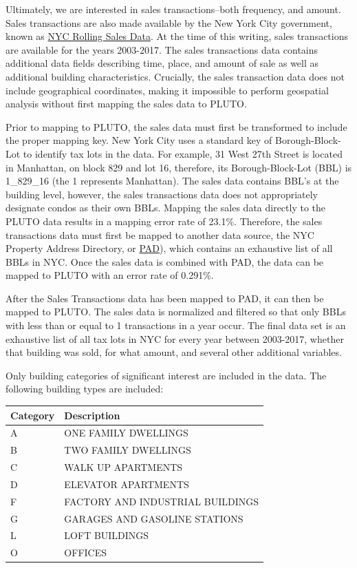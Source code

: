 \documentclass[]{article}
\begin{document}
Ultimately, we are interested in sales transactions--both frequency, and
amount. Sales transactions are also made available by the New York City
government, known as
\href{http://www1.nyc.gov/site/finance/taxes/property-annualized-sales-update.page}{NYC
Rolling Sales Data}. At the time of this writing, sales transactions are
available for the years 2003-2017. The sales transactions data contains
additional data fields describing time, place, and amount of sale as
well as additional building characteristics. Crucially, the sales
transaction data does not include geographical coordinates, making it
impossible to perform geospatial analysis without first mapping the
sales data to PLUTO.

Prior to mapping to PLUTO, the sales data must first be transformed to
include the proper mapping key. New York City uses a standard key of
Borough-Block-Lot to identify tax lots in the data. For example, 31 West
27th Street is located in Manhattan, on block 829 and lot 16, therefore,
its Borough-Block-Lot (BBL) is 1\_829\_16 (the 1 represents Manhattan).
The sales data contains BBL's at the building level, however, the sales
transactions data does not appropriately designate condos as their own
BBLs. Mapping the sales data directly to the PLUTO data results in a
mapping error rate of 23.1\%. Therefore, the sales transactions data
must first be mapped to another data source, the NYC Property Address
Directory, or
\href{https://data.cityofnewyork.us/City-Government/Property-Address-Directory/bc8t-ecyu/data}{PAD}),
which contains an exhaustive list of all BBLs in NYC. Once the sales
data is combined with PAD, the data can be mapped to PLUTO with an error
rate of 0.291\%.

After the Sales Transactions data has been mapped to PAD, it can then be
mapped to PLUTO. The sales data is normalized and filtered so that only
BBLs with less than or equal to 1 transactions in a year occur. The
final data set is an exhaustive list of all tax lots in NYC for every
year between 2003-2017, whether that building was sold, for what amount,
and several other additional variables.

Only building categories of significant interest are included in the
data. The following building types are included:

\begin{longtable}[]{@{}ll@{}}
\toprule
Category & Description\tabularnewline
\midrule
\endhead
A & ONE FAMILY DWELLINGS\tabularnewline
B & TWO FAMILY DWELLINGS\tabularnewline
C & WALK UP APARTMENTS\tabularnewline
D & ELEVATOR APARTMENTS\tabularnewline
F & FACTORY AND INDUSTRIAL BUILDINGS\tabularnewline
G & GARAGES AND GASOLINE STATIONS\tabularnewline
L & LOFT BUILDINGS\tabularnewline
O & OFFICES\tabularnewline
\bottomrule
\end{longtable}
\end{document}
